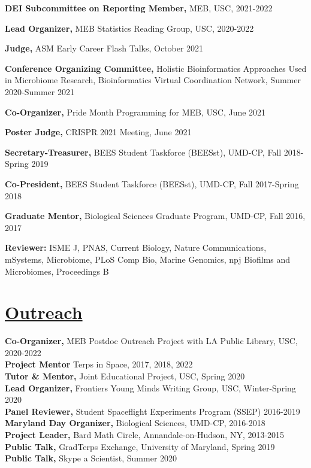 \documentclass[]{res}
\begin{document}
\begin{resume}
{\bf DEI Subcommittee on Reporting Member,} {MEB}, USC, 2021-2022

{\bf Lead Organizer,} {MEB Statistics Reading Group}, USC, 2020-2022

{\bf Judge,} ASM Early Career Flash Talks, October 2021

{\bf Conference Organizing Committee,} {Holistic Bioinformatics Approaches Used in Microbiome Research}, Bioinformatics Virtual Coordination Network, Summer 2020-Summer 2021

{\bf Co-Organizer,} {Pride Month Programming for MEB}, USC, June 2021


{\bf Poster Judge,} {CRISPR 2021 Meeting}, June 2021

{\bf Secretary-Treasurer,} {BEES Student Taskforce (BEESst)}, UMD-CP, Fall 2018-Spring 2019 %

{\bf Co-President,} {BEES Student Taskforce (BEESst)}, UMD-CP, Fall 2017-Spring 2018

{\bf Graduate Mentor,} {Biological Sciences Graduate Program}, UMD-CP, Fall 2016, 2017 %

{\bf Reviewer:} ISME J, PNAS, Current Biology, Nature Communications, mSystems, Microbiome, PLoS Comp Bio, Marine Genomics, npj Biofilms and Microbiomes, Proceedings B\\


\section{\underline{Outreach}}\vspace{2mm}
{\bf Co-Organizer,} MEB Postdoc Outreach Project with LA Public Library, USC, 2020-2022\\
{\bf Project Mentor} Terps in Space, 2017, 2018, 2022\\
{\bf Tutor \& Mentor,} Joint Educational Project, USC, Spring 2020\\
{\bf Lead Organizer,} Frontiers Young Minds Writing Group, USC, Winter-Spring 2020\\
{\bf Panel Reviewer,} Student Spaceflight Experiments Program (SSEP) 2016-2019\\
{\bf Maryland Day Organizer,} Biological Sciences, UMD-CP, 2016-2018\\
{\bf Project Leader,} Bard Math Circle, Annandale-on-Hudson, NY, 2013-2015 \\
{\bf Public Talk,} GradTerps Exchange, University of Maryland, Spring 2019\\
{\bf Public Talk,} Skype a Scientist, Summer 2020


\end{resume}
\end{document}
